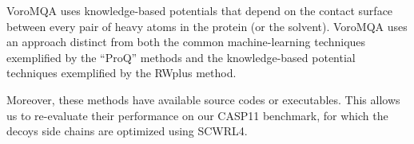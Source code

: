 VoroMQA uses knowledge-based potentials that depend on the contact
surface between every pair of heavy atoms in the protein (or the
solvent).
VoroMQA uses an approach distinct from both the common
machine-learning techniques exemplified by the ``ProQ'' methods and
the knowledge-based potential techniques exemplified by the RWplus
method.
%




%
%

%
Moreover, these methods have available source codes or executables.
This allows us to re-evaluate their performance on our CASP11
benchmark, for which the decoys side chains are optimized using
SCWRL4.


